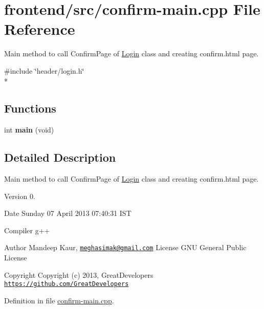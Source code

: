 \hypertarget{confirm-main_8cpp}{\section{frontend/src/confirm-\/main.cpp File Reference}
\label{confirm-main_8cpp}
}


Main method to call Confirm\-Page of \hyperlink{classLogin}{Login} class and creating confirm.\-html page.  


{\ttfamily \#include \char`\"{}header/login.\-h\char`\"{}}\\*
\subsection*{Functions}
\begin{DoxyCompactItemize}
\item 
\hypertarget{confirm-main_8cpp_a840291bc02cba5474a4cb46a9b9566fe}{int {\bfseries main} (void)}\label{confirm-main_8cpp_a840291bc02cba5474a4cb46a9b9566fe}

\end{DoxyCompactItemize}


\subsection{Detailed Description}
Main method to call Confirm\-Page of \hyperlink{classLogin}{Login} class and creating confirm.\-html page. \begin{DoxyVersion}{Version}
0. 
\end{DoxyVersion}
\begin{DoxyDate}{Date}
Sunday 07 April 2013 07\-:40\-:31 I\-S\-T\par
 Compiler g++
\end{DoxyDate}
\begin{DoxyAuthor}{Author}
Mandeep Kaur, \href{mailto:meghasimak@gmail.com}{\tt meghasimak@gmail.\-com} License G\-N\-U General Public License 
\end{DoxyAuthor}
\begin{DoxyCopyright}{Copyright}
Copyright (c) 2013, Great\-Developers \href{https://github.com/GreatDevelopers}{\tt https\-://github.\-com/\-Great\-Developers} 
\end{DoxyCopyright}


Definition in file \hyperlink{confirm-main_8cpp_source}{confirm-\/main.\-cpp}.

